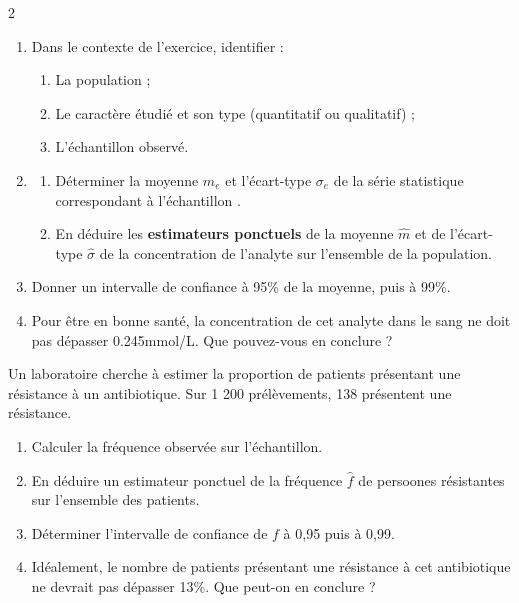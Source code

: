 \documentclass[10pt,a4paper]{article}
\begin{document}
\begin{multicols}{2}
\begin{exo}[][ccf]
\begin{enumerate}
    \item Dans le contexte de l'exercice, identifier :\begin{enumerate}
        \item La population ;
        \item Le caractère étudié et son type (quantitatif ou qualitatif) ;
        \item L'échantillon observé.
    \end{enumerate}
    \item \begin{enumerate}
        \item Déterminer la moyenne \(m_e\) et l'écart-type \(\sigma_e\) de la série statistique correspondant à l'échantillon .
        \item En déduire les \textbf{estimateurs ponctuels} de la moyenne \(\hat{m}\) et de l'écart-type \(\hat{\sigma}\) de la concentration de l'analyte sur l'ensemble de la population.
    \end{enumerate}
    \item Donner un intervalle de confiance à 95\% de la moyenne, puis à 99\%.
    \item Pour être en bonne santé, la concentration de cet analyte dans le sang ne doit pas dépasser 0.245mmol/L. Que pouvez-vous en conclure ?
\end{enumerate}
\end{exo}

\begin{exo}[][ccf]
    Un laboratoire cherche à estimer la proportion de patients présentant une résistance à un antibiotique. \medbreak
    Sur 1 200 prélèvements, 138 présentent une résistance.
    \begin{enumerate}
        \item Calculer la fréquence observée sur l'échantillon.
        \item En déduire un estimateur ponctuel de la fréquence \(\hat{f}\) de persoones résistantes sur l'ensemble des patients.
        \item Déterminer l'intervalle de confiance de \(f\) à 0,95 puis à 0,99.
        \item Idéalement, le nombre de patients présentant une résistance à cet antibiotique ne devrait pas dépasser 13\%. Que  peut-on en conclure ?
    \end{enumerate}
\end{exo}

\begin{exo}[QCM][]


\end{exo}
\end{multicols}
\end{document}
